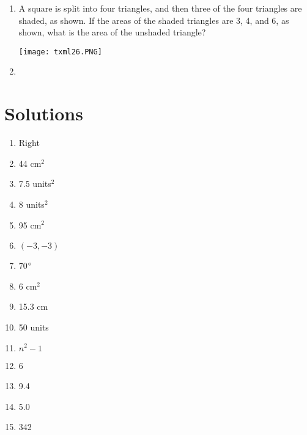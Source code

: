 \documentclass[../uilmath.tex]{subfiles}
\begin{document}
\begin{enumerate}[label=\bfseries\arabic*.]
    \item %
    A square is split into four triangles, and then three of the four triangles are shaded, as shown. If the areas of the shaded triangles are 3, 4, and 6, as shown, what is the area of the unshaded triangle?
    \begin{center}
        \texttt{[image: txml26.PNG]}
    \end{center}

    \item %
    
\end{enumerate}

\section*{Solutions}
\begin{enumerate}[label=\bfseries\arabic*.]
    \item %
    Right 

    \item %
    44 cm$^2$

    \item %
    7.5 units$^2$

    \item %
    8 units$^2$

    \item %
    95 cm$^2$

    \item %
    $(-3,-3)$

    \item %
    70$\degree$

    \item %
    6 cm$^2$

    \item %
    15.3 cm 

    \item %
    50 units 

    \item %
    $n^2-1$

    \item %
    6

    \item %
    9.4

    \item %
    5.0

    \item %
    342


\end{enumerate}
\end{document}
